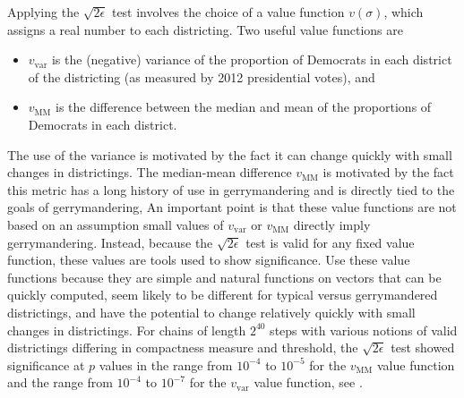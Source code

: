\documentclass[12pt]{article}
\begin{document}
Applying the \( \sqrt{2\epsilon} \) test involves the choice of a value
function \( v(\sigma) \), which assigns a real number to each
districting.  Two useful value functions are
\begin{itemize}
    \item
        \( v_{\text{var}} \) is the (negative) variance of the
        proportion of Democrats in each district of the districting (as
        measured by 2012 presidential votes), and
    \item
        \( v_{\text{MM}} \) is the difference between the median and
        mean of the proportions of Democrats in each district.
\end{itemize}
The use of the variance is motivated by the fact it can change quickly
with small changes in districtings.  The median-mean difference \( v_{\text
{MM}} \) is motivated by the fact this metric has a long history of use
in gerrymandering and is directly tied to the goals of gerrymandering,
An important point is that these value functions are not based on an
assumption small values of \( v_{\text {var}} \) or \( v_{\text{MM}} \)
directly imply gerrymandering.  Instead, because the \( \sqrt{2\epsilon} \)
test is valid for any fixed value function, these values are tools used
to show significance.  Use these value functions because they are simple and
natural functions on vectors that can be quickly computed, seem likely
to be different for typical versus gerrymandered districtings, and have
the potential to change relatively quickly with small changes in
districtings.  For chains of length \( 2^{40} \) steps with various
notions of valid districtings differing in compactness measure and
threshold, the \( \sqrt{2\epsilon} \) test showed significance at \( p \)
values in the range from \( 10^{-4} \) to \( 10^ {-5} \) for the \( v_{\text
{MM}} \) value function and the range from \( 10^{-4} \) to \( 10^{-7} \)
for the \( v_{\text{var}} \) value function, see
\cite{chikina2860si}.
\end{document}
